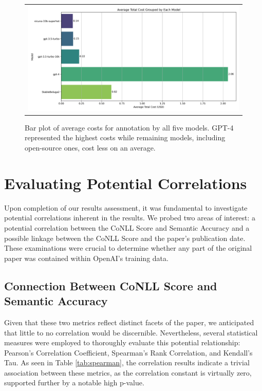 \begin{figure}[htpb]
  \centering
  \begin{tabular}{c}
  \includegraphics[width=14cm]{images/open-cost.png}
  \end{tabular}
  \caption[Open Source Time]{Bar plot of average costs for annotation by all five models. GPT-4 represented the highest costs while remaining models, including open-source ones, cost less on an average.}\label{fig:open-cost}
\end{figure}

\section{Evaluating Potential Correlations}

Upon completion of our results assessment, it was fundamental to investigate potential correlations inherent in the results. We probed two areas of interest: a potential correlation between the CoNLL Score and Semantic Accuracy and a possible linkage between the CoNLL Score and the paper's publication date. These examinations were crucial to determine whether any part of the original paper was contained within OpenAI's training data.


\subsection{Connection Between CoNLL Score and Semantic Accuracy}

Given that these two metrics reflect distinct facets of the paper, we anticipated that little to no correlation would be discernible. Nevertheless, several statistical measures were employed to thoroughly evaluate this potential relationship: Pearson's Correlation Coefficient, Spearman's Rank Correlation, and Kendall's Tau. As seen in Table \ref{tab:spearman}, the correlation results indicate a trivial association between these metrics, as the correlation constant is virtually zero, supported further by a notable high p-value.

